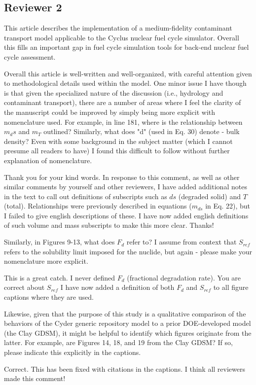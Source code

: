 \documentclass[answers,12pt]{exam}
\begin{document}
\begin{questions}
\section*{Reviewer 2}

\question This article describes the implementation of a medium-fidelity contaminant transport model applicable to the Cyclus nuclear fuel cycle simulator. Overall this fills an important gap in fuel cycle simulation tools for back-end nuclear fuel cycle assessment.

Overall this article is well-written and well-organized, with careful attention given to methodological details used within the model. One minor issue I have though is that given the specialized nature of the discussion (i.e., hydrology and contaminant transport), there are a number of areas where I feel the clarity of the manuscript could be improved by simply being more explicit with nomenclature used. For example, in line 181, where is the relationship between $m_ds$ and $m_T$ outlined? Similarly, what does "d" (used in Eq. 30) denote - bulk density? Even with some background in the subject matter (which I cannot presume all readers to have) I found this difficult to follow without further explanation of nomenclature.
\begin{solution}
Thank you for your kind words. In response to this comment, as well as other similar comments by yourself and 
        other reviewers, I have added 
        additional notes in the text to call out  definitions of subscripts 
        such as $ds$ (degraded solid) and $T$ (total). Relationships were previously described in 
        equations ($m_{ds}$ in Eq. 22), but I failed to give english 
        descriptions of these. I have now added english definitions of such volume and 
        mass subscripts to make this more clear. Thanks! 
\end{solution}

\question Similarly, in Figures 9-13, what does $F_d$ refer to? I assume from 
context that $S_{ref}$ refers to the solubility limit imposed for the nuclide, but again - please make your nomenclature more explicit. 
\begin{solution}
        This is a great catch. I never defined $F_d$ (fractional degradation 
        rate). You are correct about $S_{ref}$ I have now added a definition of 
        both $F_d$ and $S_{ref}$ to all figure captions where they are used. 
\end{solution}

\question Likewise, given that the purpose of this study is a qualitative comparison of the behaviors of the Cyder generic repository model to a prior DOE-developed model (the Clay GDSM), it might be helpful to identify which figures originate from the latter. For example, are Figures 14, 18, and 19 from the Clay GDSM? If so, please indicate this explicitly in the captions. 
\begin{solution}
Correct. This has been fixed with citations in the captions. I think all reviewers made this comment! 
\end{solution}


\end{questions}
\end{document}
